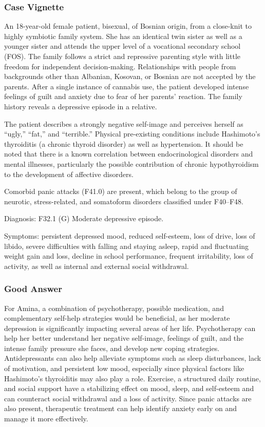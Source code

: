 \documentclass[sigconf,natbib=false]{acmart}
\begin{document}
\subsubsection{Case Vignette}
An 18-year-old female patient, bisexual, of Bosnian origin, from a close-knit to highly symbiotic family system.
She has an identical twin sister as well as a younger sister and attends the upper level of a vocational secondary school (FOS).
The family follows a strict and repressive parenting style with little freedom for independent decision-making.
Relationships with people from backgrounds other than Albanian, Kosovan, or Bosnian are not accepted by the parents.
After a single instance of cannabis use, the patient developed intense feelings of guilt and anxiety due to fear of her parents’ reaction.
The family history reveals a depressive episode in a relative.

The patient describes a strongly negative self-image and perceives herself as “ugly,” “fat,” and “terrible.” Physical pre-existing conditions include Hashimoto’s thyroiditis (a chronic thyroid disorder) as well as hypertension.
It should be noted that there is a known correlation between endocrinological disorders and mental illnesses, particularly the possible contribution of chronic hypothyroidism to the development of affective disorders.

Comorbid panic attacks (F41.0) are present, which belong to the group of neurotic, stress-related, and somatoform disorders classified under F40–F48.

Diagnosis: F32.1 (G) Moderate depressive episode.

Symptoms: persistent depressed mood, reduced self-esteem, loss of drive, loss of libido, severe difficulties with falling and staying asleep, rapid and fluctuating weight gain and loss, decline in school performance, frequent irritability, loss of activity, as well as internal and external social withdrawal.
\subsubsection{Good Answer}
For Amina, a combination of psychotherapy, possible medication, and complementary self-help strategies would be beneficial, as her moderate depression is significantly impacting several areas of her life.
Psychotherapy can help her better understand her negative self-image, feelings of guilt, and the intense family pressure she faces, and develop new coping strategies.
Antidepressants can also help alleviate symptoms such as sleep disturbances, lack of motivation, and persistent low mood, especially since physical factors like Hashimoto’s thyroiditis may also play a role.
Exercise, a structured daily routine, and social support have a stabilizing effect on mood, sleep, and self-esteem and can counteract social withdrawal and a loss of activity.
Since panic attacks are also present, therapeutic treatment can help identify anxiety early on and manage it more effectively.
\end{document}
